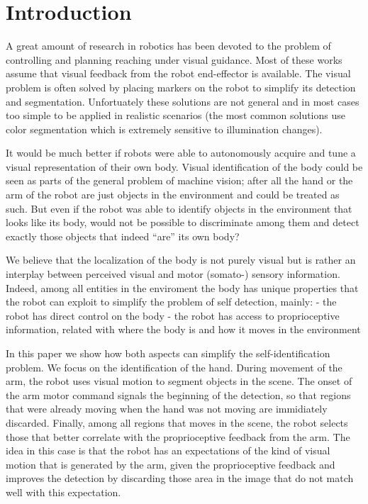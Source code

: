 \section{Introduction}\label{introduction}

A great amount of research in robotics has been devoted to the problem of 
controlling and planning reaching under visual guidance. Most 
of these works assume that visual feedback from the robot 
end-effector is available. The visual problem is often solved by 
placing markers on the robot to simplify its detection and 
segmentation. Unfortuately these solutions are not general and in most cases 
too simple to be applied in realistic 
scenarios (the most common solutions use 
color segmentation which is extremely sensitive to illumination changes).

It would be much better if robots were able to autonomously acquire and tune 
a visual representation of their own body. Visual identification of the body 
could be seen as parts of the general problem of machine vision; after all the 
hand or the arm of the robot are just objects in the environment and could be 
treated as such. But even if the robot was able to identify objects in the 
environment that looks like its body, would not be possible to discriminate 
among them and detect exactly those objects that indeed ``are'' its own body?

We believe that the localization of the body is not purely visual but is 
rather an interplay between perceived visual and motor (somato-) sensory information. 
Indeed, among all entities in the enviroment the body has unique properties 
that the robot can exploit to simplify the problem of self detection, mainly:
- the robot has direct control on the body
- the robot has access to proprioceptive information, related with where the body is and how it moves in the environment

In this paper we show how both aspects can simplify the self-identification 
problem. We focus on the identification of the hand. During movement of the 
arm, the robot uses visual motion to segment objects in the scene. The 
onset of the arm motor command signals the beginning of the detection, so that
regions that were already moving when the hand was not moving are immidiately 
discarded. Finally, among all regions that moves in the scene, the robot 
selects those that better correlate with the proprioceptive feedback from 
the arm. The idea in this case is that the robot has an expectations of the 
kind of visual motion that is generated by the arm, given the proprioceptive
feedback and improves the detection by discarding 
those area in the image that do not match well with this expectation.

